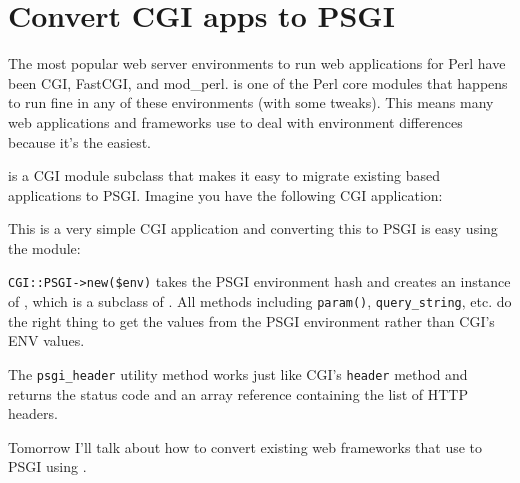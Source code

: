 \chapter{Convert CGI apps to PSGI}\label{day-6-convert-cgi-apps-to-psgi}

The most popular web server environments to run web applications for
Perl have been CGI, FastCGI, and mod\_perl.  is one of the Perl
core modules that happens to run fine in any of these environments (with
some tweaks). This means many web applications and frameworks use 
to deal with environment differences because it's the easiest.

\href{http://search.cpan.org/perldoc?CGI::PSGI}{} is a CGI
module subclass that makes it easy to migrate existing  based
applications to PSGI. Imagine you have the following CGI application:


This is a very simple CGI application and converting this to PSGI is
easy using the  module:


\lstinline!CGI::PSGI->new($env)! takes the PSGI environment hash and
creates an instance of , which is a subclass of . All
methods including \lstinline!param()!, \lstinline!query_string!, etc. do
the right thing to get the values from the PSGI environment rather than
CGI's ENV values.

The \lstinline!psgi_header! utility method works just like CGI's
\lstinline!header! method and returns the status code and an array
reference containing the list of HTTP headers.

Tomorrow I'll talk about how to convert existing web frameworks that use
 to PSGI using .


